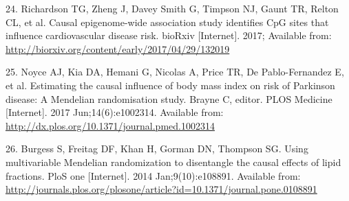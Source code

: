 \documentclass[]{article}
\begin{document}
\hypertarget{ref-Richardson2017}{}
24. Richardson TG, Zheng J, Davey Smith G, Timpson NJ, Gaunt TR, Relton
CL, et al. Causal epigenome-wide association study identifies CpG sites
that influence cardiovascular disease risk. bioRxiv {[}Internet{]}.
2017; Available from:
\url{http://biorxiv.org/content/early/2017/04/29/132019}

\hypertarget{ref-Noyce2017}{}
25. Noyce AJ, Kia DA, Hemani G, Nicolas A, Price TR, De Pablo-Fernandez
E, et al. Estimating the causal influence of body mass index on risk of
Parkinson disease: A Mendelian randomisation study. Brayne C, editor.
PLOS Medicine {[}Internet{]}. 2017 Jun;14(6):e1002314. Available from:
\url{http://dx.plos.org/10.1371/journal.pmed.1002314}

\hypertarget{ref-Burgess2014a}{}
26. Burgess S, Freitag DF, Khan H, Gorman DN, Thompson SG. Using
multivariable Mendelian randomization to disentangle the causal effects
of lipid fractions. PloS one {[}Internet{]}. 2014 Jan;9(10):e108891.
Available from:
\url{http://journals.plos.org/plosone/article?id=10.1371/journal.pone.0108891}
\end{document}
